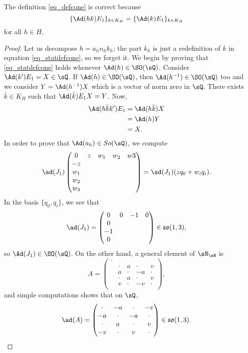 \begin{proposition}
The definition \eqref{eq_defcone} is correct because
\begin{equation}  \label{eq_statdefcone}
  \{ \Ad(hk)E_1 \}_{k\in K_H}=\{ \Ad(k)E_1 \}_{k\in K_H}
\end{equation}
for all $h\in H$. 
\end{proposition}

\begin{proof}
Let us decompose $h=a_hn_hk_h$; the part $k_h$ is just a redefinition of $k$ in equation \eqref{eq_statdefcone}, so we forget it. We begin by proving that \eqref{eq_statdefcone} holds whenever $\Ad(h)\in \SO(\sQ)$. Consider $\Ad(k')E_1=X\in\sQ$. If $\Ad(h)\in \SO(\sQ)$, then $\Ad(h^{-1})\in \SO(\sQ)$ too and we consider $Y=\Ad(h^{-1})X$ which is a vector of norm zero in $\sQ$. There exists $\bar k\in K_H$ such that $\Ad(\bar k)E_1X=Y$. Now,
\begin{equation}
\begin{split}
\Ad(h\bar kk')E_1&=\Ad(h\bar k)X\\
		&=\Ad(h)Y\\
		&=X.
\end{split}
\end{equation}
In order to prove that $\Ad(a_h)\in So(\sQ)$, we compute
\[ 
  \ad(J_1)\begin{pmatrix}
0	& z	& w_1	& w_2	& w3\\
-z\\
w_1\\
w_2\\
w_3
\end{pmatrix}
=\ad(J_1)(zq_0+w_iq_i).
\]
In the basis $\{ q_0,q_i \}$, we see that
\[ 
  \ad(J_1)=\begin{pmatrix}
0&0&-1&0\\
0\\-1\\0
\end{pmatrix}\in\mathfrak{so}(1,3),
\]
so $\Ad(J_1)\in \SO(\sQ)$. On the other hand, a general element of $\sN_{\sH}$ is
\[ 
  A=\begin{pmatrix}
\cdot\\
&\cdot& a&\cdot& v\\
&a&\cdot &-a&\cdot\\
&  \cdot& a&\cdot& v\\
&v&\cdot&-v&\cdot\\
\end{pmatrix},
\]
and simple computations shows that on $\sQ$,
\[ 
  \ad(A)=\begin{pmatrix}
\cdot &-a&\cdot&-v\\
-a&\cdot&-a&\cdot\\
\cdot&a&\cdot &v\\
-v&\cdot&v&\cdot
\end{pmatrix}\in\mathfrak{so}(1,3).
\]
\end{proof}

